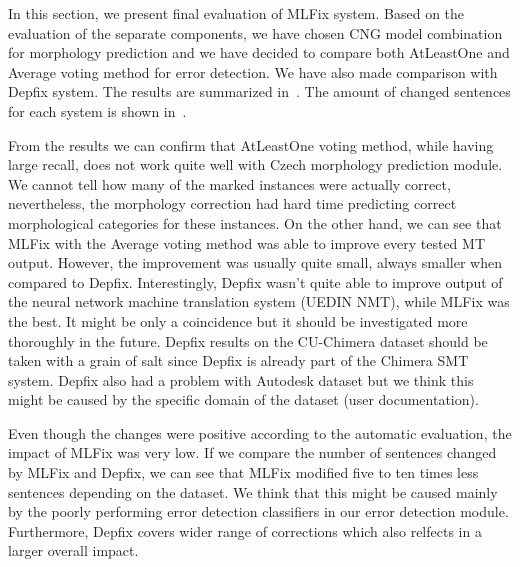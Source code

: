 In this section, we present final evaluation of MLFix system. Based on the evaluation of the
separate components, we have chosen CNG model combination for morphology prediction and we
have decided to compare both AtLeastOne and Average voting method for error detection. We
have also made comparison with Depfix system. The results are summarized in~.
The amount of changed sentences for each system is shown in~.

From the results we can confirm that AtLeastOne voting method, while having large recall, does not work
quite well with Czech morphology prediction module. We cannot tell how many of the marked instances were actually
correct, nevertheless, the morphology correction had hard time predicting correct morphological categories
for these instances. On the other hand, we can see that MLFix with the Average voting method
was able to improve every tested MT output. However, the improvement was
usually quite small, always smaller when compared to Depfix. Interestingly,
Depfix wasn't quite able to improve output of the neural network machine translation system (UEDIN NMT),
while MLFix was the best. It might be only a coincidence but it should be investigated more thoroughly
in the future. Depfix results on the CU-Chimera dataset should be taken with a grain of salt since
Depfix is already part of the Chimera SMT system. Depfix also had a problem with Autodesk dataset
but we think this might be caused by the specific domain of the dataset (user documentation).

Even though the changes were positive according to the automatic evaluation, the impact of MLFix was
very low. If we compare the number of sentences changed by MLFix and Depfix, we can see that MLFix
modified five to ten times less sentences depending on the dataset. We think that this might be
caused mainly by the poorly performing error detection classifiers in our error detection module.
Furthermore, Depfix covers wider range of corrections which also relfects in a larger overall impact.

